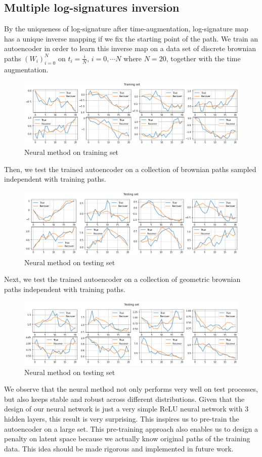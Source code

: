 \documentclass[12pt]{report}
\theoremstyle{definition}
\theoremstyle{remark}
\begin{document}
\subsection{Multiple log-signatures inversion}
By the uniqueness of log-signature after time-augmentation, log-signature map has a unique inverse mapping if we fix the starting point of the path. We train an autoencoder in order to learn this inverse map on a data set of discrete brownian paths $(W_{i})_{i=0}^{N}$ on $t_{i} = \frac{i}{N}$, $i = 0,\cdots N$ where $N = 20$, together with the time augmentation. 
 \begin{figure}[H]
  \centering
  \includegraphics[width=\textwidth]{figs/inverse10.png}
  \caption{Neural method on training set }
\end{figure}
Then, we test the trained autoencoder on a collection of brownian paths sampled independent with training paths.
 \begin{figure}[H]
  \centering
  \includegraphics[width=\textwidth]{figs/inverse11.png}
  \caption{Neural method on testing set }
\end{figure}
Next, we test the trained autoencoder on a collection of geometric brownian paths independent with training paths.
 \begin{figure}[H]
  \centering
  \includegraphics[width=\textwidth]{figs/inverse12.png}
  \caption{Neural method on testing set }
\end{figure}
We observe that the neural method not only performs very well on test processes, but also keeps stable and robust across different distributions. Given that the design of our neural network is just a very simple ReLU neural network with 3 hidden layers, this result is very surprising. This inspires us to pre-train the autoencoder on a large set. This pre-training approach also enables us to design a penalty on latent space because we actually know original paths of the training data. This idea should be made rigorous and implemented in future work. 
\end{document}
